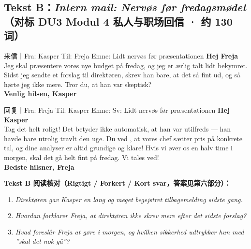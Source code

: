 \subsection*{Tekst B：\textit{Intern mail: Nervøs før fredagsmødet}（对标 DU3 Modul 4 私人与职场回信 · 约 130 词）}

\begin{emailbox}{来信｜Fra: Kasper \quad Til: Freja \quad Emne: Lidt nervøs før præsentationen}
\textbf{Hej Freja}\\
Jeg skal præsentere vores nye budget på fredag, og jeg er ærlig talt lidt bekymret. Sidst jeg sendte et forslag til direktøren, skrev han bare, at det  så fint ud, og så hørte jeg ikke mere. Tror du, at han var skeptisk?\\
\textbf{Venlig hilsen, Kasper}
\end{emailbox}

\begin{emailbox}{回复｜Fra: Freja \quad Til: Kasper \quad Emne: Sv: Lidt nervøs før præsentationen}
\textbf{Hej Kasper}\\
Tag det helt roligt! Det betyder  ikke automatisk, at han var utilfreds --- han havde  bare utrolig travlt den uge. Du ved , at vores chef sætter pris på konkrete tal, og dine analyser er  altid grundige og klare! Hvis vi øver os en halv time i morgen, skal det  gå helt fint på fredag. Vi tales ved!\\
\textbf{Bedste hilsner, Freja}
\end{emailbox}

\textbf{Tekst B 阅读核对（Rigtigt / Forkert / Kort svar，答案见第六部分）：}
\begin{enumerate}
  \item \textit{Direktøren gav Kasper en lang og meget begejstret tilbagemelding sidste gang.} \underline{\hspace{2.2cm}}
  \item \textit{Hvordan forklarer Freja, at direktøren ikke skrev mere efter det sidste forslag?} \\\underline{\hspace{5.2cm}}
  \item \textit{Hvad foreslår Freja at gøre i morgen, og hvilken sikkerhed udtrykker hun med ”skal det nok gå”?} \underline{\hspace{5.2cm}}
\end{enumerate}

